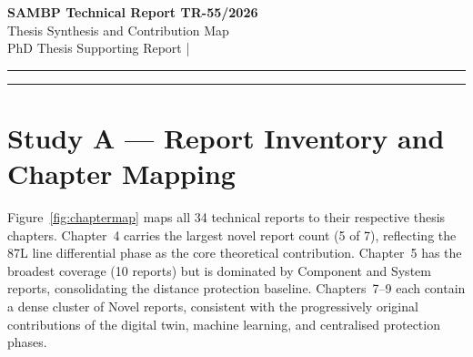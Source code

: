 \documentclass[11pt,a4paper]{article}
\begin{document}
\begin{center}
  {\LARGE\bfseries\color{sambpblue} SAMBP Technical Report TR-55/2026}\\[6pt]
  {\large Thesis Synthesis and Contribution Map}\\[10pt]
  {\normalsize PhD Thesis Supporting Report \quad|}
\end{center}

\vspace{2pt}\hrule\vspace{8pt}

\begin{abstract}
\noindent
This report synthesises the complete SAMBP technical report series as
a map of original contributions, cross-report dependencies, and a
publication roadmap.  Study~A inventories 34 technical reports across
six thesis chapters (Chapters~4--9) and classifies each as Novel,
System, Validation, or Component.  Study~B enumerates 18 original
contributions with novelty and significance scores; 6 achieve Tier-1
status (novelty $\geq 5$, significance $\geq 5$) and span all five
research thrusts: line differential, microgrid, digital twin, machine
learning, and centralised protection.  Study~C traces 9 key
cross-report dependencies, establishing that the Physics-Informed Neural
Network (TR-46) and the Digital Twin (TR-43) are the two critical
upstream dependencies for the centralised control phase.  Study~D
proposes 5 journal papers targeting IEEE Transactions, 2 of which are
draft-ready and 2 in preparation.  Study~E identifies 7 future-work
gaps, 2 high-priority: multi-substation WAPC scaling and real-field
PINN validation data.
\end{abstract}

\vspace{4pt}\hrule\vspace{10pt}

\section{Study A --- Report Inventory and Chapter Mapping}
\label{sec:studyA}

Figure~\ref{fig:chaptermap} maps all 34 technical reports to their
respective thesis chapters.  Chapter~4 carries the largest novel
report count (5 of 7), reflecting the 87L line differential phase as the
core theoretical contribution.  Chapter~5 has the broadest coverage
(10 reports) but is dominated by Component and System reports,
consolidating the distance protection baseline.  Chapters~7--9 each
contain a dense cluster of Novel reports, consistent with the
progressively original contributions of the digital twin, machine
learning, and centralised protection phases.
\end{document}
